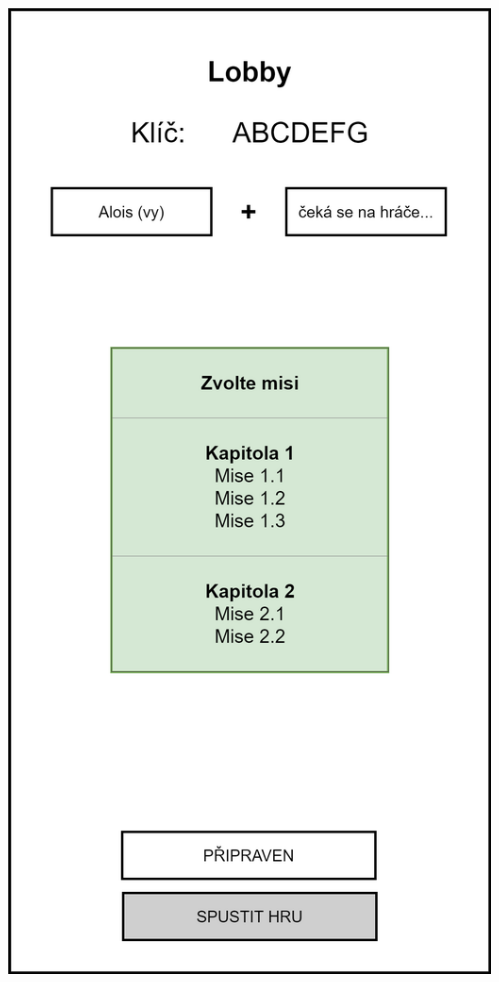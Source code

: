 \documentclass[czech,aspectratio=169]{beamer}
\begin{document}
\begin{frame}
\begin{columns}
\begin{column}{.25\textwidth}
\begin{center}
          \includegraphics[width=.9\textwidth]{assets/slides/screen-2}
        \end{center}
      \end{column}
      \begin{column}{.25\textwidth}
        \begin{center}

\end{center}
\end{column}
\end{columns}
\end{frame}
\end{document}
